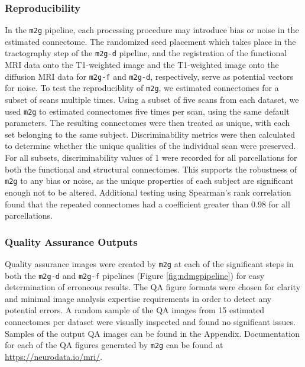\subsubsection{Reproducibility}
In the \texttt{m2g} pipeline, each processing procedure may introduce bias or noise in the estimated connectome. The randomized seed placement which takes place in the tractography step of the \texttt{m2g-d} pipeline, and the registration of the functional MRI data onto the T1-weighted image and the T1-weighted image onto the diffusion MRI data for \texttt{m2g-f} and \texttt{m2g-d}, respectively, serve as potential vectors for noise. To test the reproduciblity of \texttt{m2g}, we estimated connectomes for a subset of scans multiple times. Using a subset of five scans from each dataset, we used \texttt{m2g} to estimated connectomes five times per scan, using the same default parameters. The resulting connectomes were then treated as unique, with each set belonging to the same subject. Discriminability metrics were then calculated to determine whether the unique qualities of the individual scan were preserved. For all subsets, discriminability values of 1 were recorded for all parcellations for both the functional and structural connectomes. This supports the robustness of \texttt{m2g} to any bias or noise, as the unique properties of each subject are significant enough not to be altered. Additional testing using Spearman's rank correlation found that the repeated connectomes had a coefficient greater than 0.98 for all parcellations.


\subsubsection{Quality Assurance Outputs}
Quality assurance images were created by \texttt{m2g} at each of the significant steps in both the \texttt{m2g-d} and \texttt{m2g-f} pipelines (Figure \ref{fig:ndmgpipeline}) for easy determination of erroneous results. The QA figure formats were chosen for clarity and minimal image analysis expertise requirements in order to detect any potential errors. A random sample of the QA images from 15 estimated connectomes per dataset were visually inspected and found no significant issues. Samples of the output QA images can be found in the Appendix. Documentation for each of the QA figures generated by \texttt{m2g} can be found at \url{https://neurodata.io/mri/}. %

